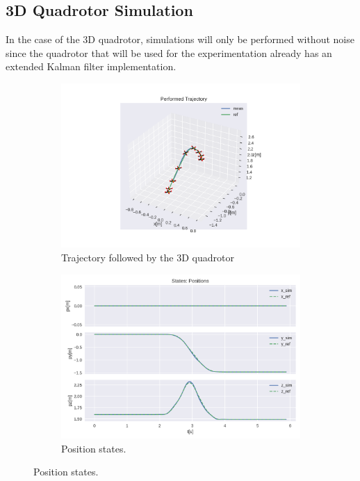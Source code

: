 \documentclass{thesisreport}
\begin{document}
\subsection{3D Quadrotor Simulation}\label{subsec:acados_simulation_3D_quadrotor_flip}

In the case of the 3D quadrotor, simulations will only be performed without noise since the quadrotor that will be used for the experimentation already has an extended Kalman filter implementation.

\newpage

\begin{figure}[H]
	\begin{subfigure}{0.45\textwidth}
		\includegraphics[width=\linewidth]{Images/acados_simulations/flip_trajectory/3D_quadrotor/sim3D.png}
		\caption{Trajectory followed by the 3D quadrotor} \label{fig:3D_flip_sim_3d}
	\end{subfigure}\hspace*{\fill}
	\begin{subfigure}{0.45\textwidth}
		\includegraphics[width=\linewidth]{Images/acados_simulations/flip_trajectory/3D_quadrotor/posStates.png}
		\caption{Position states.} \label{fig:3D_flip_sim_pose}
	\end{subfigure}


\end{figure}
\end{document}
